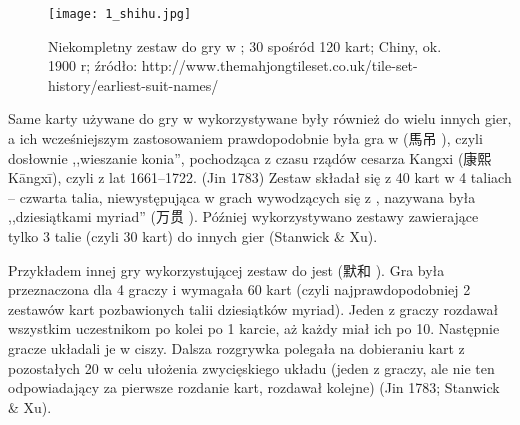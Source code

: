 \begin{figure}[h]
\centering
\texttt{[image: 1\_shihu.jpg]}
\caption{Niekompletny zestaw do gry w ; 30 spośród 120 kart;
Chiny, ok. 1900 r;  źródło:
http://www.themahjongtileset.co.uk/tile-set-history/earliest-suit-names/}
\label{fig:zestawshihu}
\end{figure}

Same karty używane do gry w  wykorzystywane były również do wielu
innych gier, a ich wcześniejszym zastosowaniem prawdopodobnie była gra w
 (馬吊 ), czyli dosłownie ,,wieszanie konia'',
pochodząca z czasu rządów cesarza Kangxi (康熙 Kāngxī), czyli z lat 1661--1722.
(Jin 1783) Zestaw  składał się z 40 kart w 4 taliach -- czwarta
talia, niewystępująca w grach wywodzących się z , nazywana była
,,dziesiątkami myriad'' (万贯 ). Później wykorzystywano zestawy
zawierające tylko 3 talie (czyli 30 kart) do innych gier (Stanwick \& Xu).

\label{mohu_page}
Przykładem innej gry wykorzystującej zestaw do  jest
 (默和 ). Gra była przeznaczona dla			
4 graczy i wymagała 60 kart (czyli najprawdopodobniej 2 zestawów kart
 pozbawionych talii dziesiątków myriad). Jeden z graczy rozdawał
wszystkim uczestnikom po kolei po 1 karcie, aż każdy miał ich po 10. Następnie
gracze układali je w ciszy. Dalsza rozgrywka polegała na dobieraniu kart z
pozostałych 20 w celu ułożenia zwycięskiego układu (jeden z graczy, ale nie ten
odpowiadający za pierwsze rozdanie kart, rozdawał kolejne) (Jin 1783; Stanwick
\& Xu).
% 


